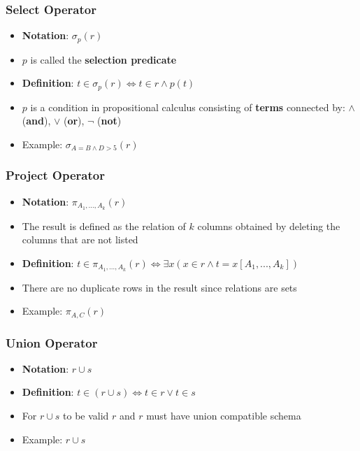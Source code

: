 \subsubsection{Select Operator}
\begin{itemize}[label=\(\rhd\)]
    \item \textbf{Notation}: $\sigma_p(r)$
    \item $p$ is called the \textbf{selection predicate}
    \item \textbf{Definition}: $t\in \sigma_p(r) \Leftrightarrow t \in r \land p(t)$
    \item $p$ is a condition in propositional calculus consisting of \textbf{terms} connected by: $\land$ (\textbf{and}), $\lor$ (\textbf{or}), $\lnot$ (\textbf{not})
    \item Example: $\sigma_{A=B\land D >5}(r)$
\end{itemize}

\subsubsection{Project Operator}
\begin{itemize}[label=\(\rhd\)]
    \item \textbf{Notation}: $\pi_{A_1,...,A_k}(r)$
    \item The result is defined as the relation of $k$ columns obtained by deleting the columns that are not listed
    \item \textbf{Definition}: $t\in \pi_{A_1,...,A_k}(r) \Leftrightarrow \exists x(x\in r \land t = x[A_1,...,A_k])$
    \item There are no duplicate rows in the result since relations are sets
    \item Example: $\pi_{A,C}(r)$
\end{itemize}

\subsubsection{Union Operator}
\begin{itemize}[label=\(\rhd\)]
    \item \textbf{Notation}: $r \cup s$
    \item \textbf{Definition}: $t\in (r\cup s) \Leftrightarrow t \in r \lor t \in s$
    \item For $r\cup s$ to be valid $r$ and $r$ must have union compatible schema
    \item Example: $r \cup s$
\end{itemize}

